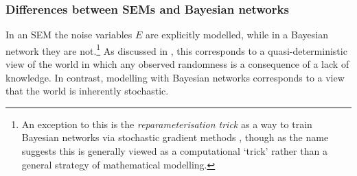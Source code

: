 

\subsubsection{Differences between SEMs and Bayesian networks}

%
%
In an SEM the noise variables $E$ are explicitly modelled, while in a Bayesian network they are not.\footnote{An exception to this is the \emph{reparameterisation trick} as a way to train Bayesian networks via stochastic gradient methods \citep{kingma2013auto,rezende2014stochastic}, though as the name suggests this is generally viewed as a computational `trick' rather than a general strategy of mathematical modelling.}
As discussed in \cite{pearl2009causality}, this corresponds to a quasi-deterministic view of the world in which any observed randomness is a consequence of a lack of knowledge. In contrast, modelling with Bayesian networks corresponds to a view that the world is inherently stochastic.

